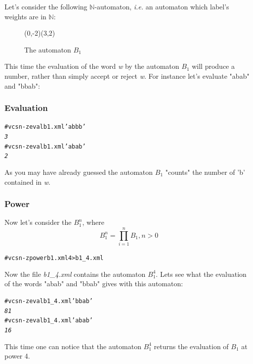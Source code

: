 Let's consider the following $\mathbb{N}$-automaton, \textit{i.e.}
an automaton which label's weights are in $\mathbb{N}$:

\begin{figure}[ht] \centering
  \begin{VCPicture}{(0,-2)(3,2)}
     
     
     
     
  \end{VCPicture}
  \caption{The automaton $B_1$}
\end{figure}

This time the evaluation of the word \textit{w} by the automaton $B_1$
will produce a number, rather than simply accept or reject \textit{w}.
For instance let's evaluate "abab" and "bbab":

\subsubsection{Evaluation}

\begin{alltt}
# vcsn-z eval b1.xml 'abbb'
\textit{3}
# vcsn-z eval b1.xml 'abab'
\textit{2}
\end{alltt}

As you may have already guessed the automaton $B_1$ "counts" the
number of 'b' contained in \textit{w}.

\subsubsection{Power}

Now let's consider the $B_1^n$, where
$$B_1^n = \prod_{i=1}^n B_1, n > 0$$

\begin{alltt}
# vcsn-z power b1.xml 4 > b1_4.xml
\end{alltt}

Now the file \textit{b1\_4.xml} contains the automaton $B_1^4$. Lets
see what the evaluation of the words "abab" and "bbab" gives with this
automaton:

\begin{alltt}
# vcsn-z eval b1_4.xml 'bbab'
\textit{81}
# vcsn-z eval b1_4.xml 'abab'
\textit{16}
\end{alltt}

This time one can notice that the automaton $B_1^4$ returns the
evaluation of $B_1$ at power 4.


